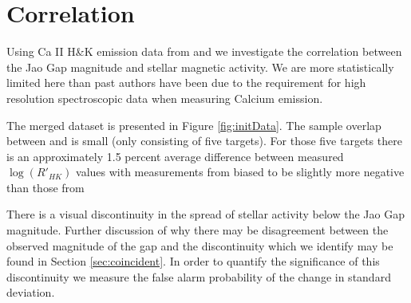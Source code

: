 \section{Correlation}\label{sec:results}
Using Ca II H\&K emission data from \citet{Perdelwitz2021} and
\citet{Boudreaux2022} \citep[quantified using the $R'_{HK}$
metric][]{Middelkoop1982, Rutten1984} we investigate the correlation between
the Jao Gap magnitude and stellar magnetic activity. We are more statistically
limited here than past authors have been due to the requirement for high
resolution spectroscopic data when measuring Calcium emission.

The merged dataset is presented in Figure \ref{fig:initData}. The
sample overlap between \citet{Perdelwitz2021} and \citet{Boudreaux2022} is
small (only consisting of five targets). For those five targets there is an
approximately 1.5 percent average difference between measured $\log(R'_{HK})$
values with measurements from \citeauthor{Boudreaux2022} biased to be slightly
more negative than those from \citeauthor{Perdelwitz2021}

There is a visual discontinuity in the spread of stellar activity
below the Jao Gap magnitude. Further discussion of why there may be
disagreement between the observed magnitude of the gap and the discontinuity
which we identify may be found in Section \ref{sec:coincident}. In order to
quantify the significance of this discontinuity we measure the false alarm
probability of the change in standard deviation.

